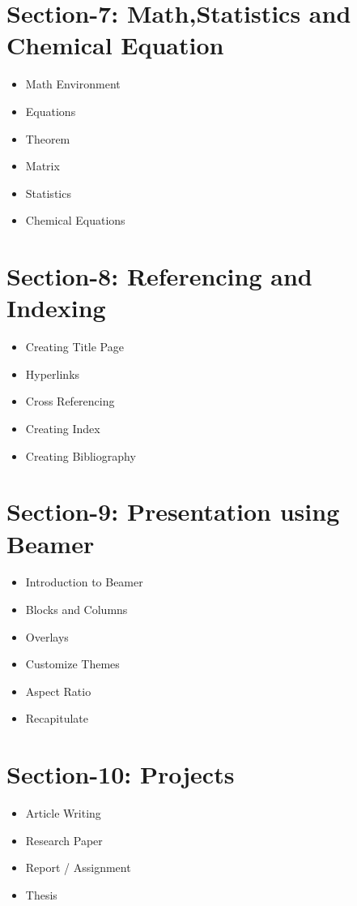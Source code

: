 \documentclass[a4paper, 12pt]{article}
\begin{document}
\section*{Section-7: Math,Statistics and Chemical Equation} 
\begin{itemize}
	\item Math Environment 
	\item Equations 
	\item Theorem
	\item Matrix 
	\item Statistics 
	\item Chemical Equations  
\end{itemize}

\section*{Section-8: Referencing and Indexing} 
\begin{itemize}
	\item Creating Title Page 
	\item Hyperlinks 
	\item Cross Referencing
	\item Creating Index 
	\item Creating Bibliography
\end{itemize}


\section*{Section-9: Presentation using Beamer} 
\begin{itemize}
	\item Introduction to Beamer 
	\item Blocks and Columns 
	\item Overlays 
	\item Customize Themes 
	\item Aspect Ratio 
	\item Recapitulate 
\end{itemize}


\section*{Section-10: Projects} 
\begin{itemize}
	\item Article Writing 
	\item Research Paper  
	\item Report / Assignment 
	\item Thesis 
\end{itemize}
\end{document}
